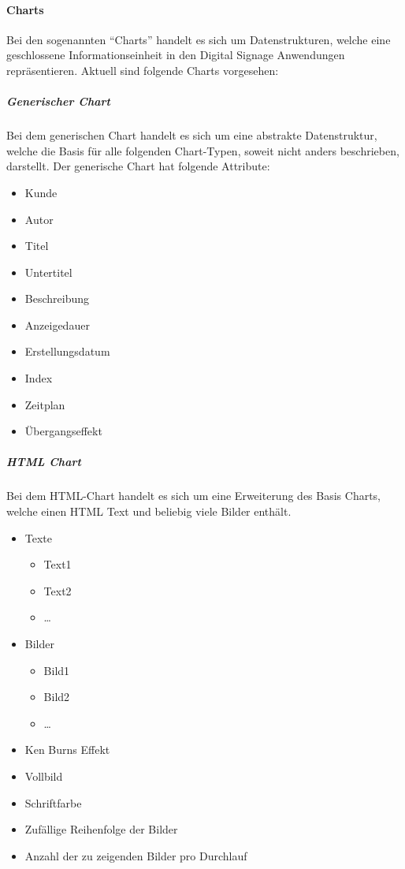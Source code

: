 \documentclass[a4paper]{article}
\begin{document}
	\paragraph{Charts}
	Bei den sogenannten \enquote{Charts} handelt es sich um Datenstrukturen, welche eine geschlossene Informationseinheit in den Digital Signage Anwendungen repräsentieren.
	Aktuell sind folgende Charts vorgesehen:
	\subparagraph{Generischer Chart}
	Bei dem generischen Chart handelt es sich um eine abstrakte Datenstruktur, welche die Basis für alle folgenden Chart-Typen, soweit nicht anders beschrieben, darstellt.
	Der generische Chart hat folgende Attribute:
	\begin{itemize}
	\item Kunde
	\item Autor
	\item Titel
	\item Untertitel
	\item Beschreibung
	\item Anzeigedauer
	\item Erstellungsdatum
	\item Index
	\item Zeitplan
	\item Übergangseffekt
	\end{itemize}
	\subparagraph{HTML Chart}
	Bei dem HTML-Chart handelt es sich um eine Erweiterung des Basis Charts, welche einen HTML Text und beliebig viele Bilder enthält.
	\begin{itemize}
	\item Texte
		\begin{itemize}
		\item Text1
		\item Text2
		\item …
		\end{itemize}
	\item Bilder
		\begin{itemize}
		\item Bild1
		\item Bild2
		\item …
		\end{itemize}
	\item Ken Burns Effekt
	\item Vollbild
	\item Schriftfarbe
	\item Zufällige Reihenfolge der Bilder
	\item Anzahl der zu zeigenden Bilder pro Durchlauf
	\end{itemize}
\end{document}
